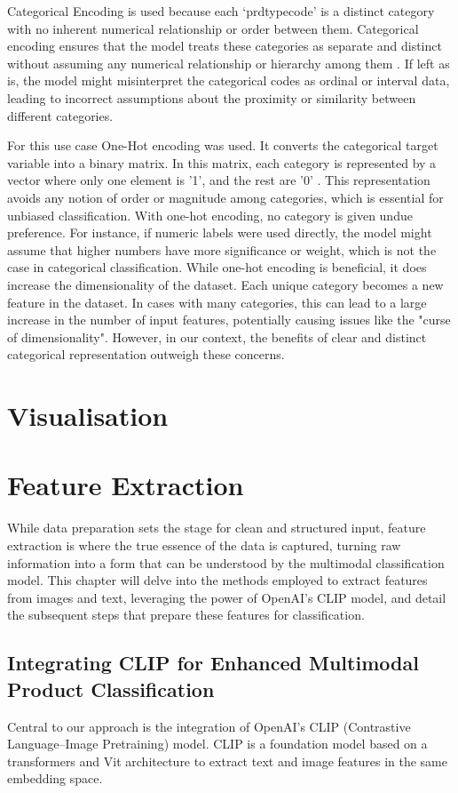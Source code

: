 Categorical Encoding is used because each ‘prdtypecode’ is a distinct category with no inherent numerical relationship or order between them. Categorical encoding ensures that the model treats these categories as separate and distinct without assuming any numerical relationship or hierarchy among them \cite{potdar-2017}. If left as is, the model might misinterpret the categorical codes as ordinal or interval  data, leading to incorrect assumptions about the proximity or similarity between different categories.

For this use case One-Hot encoding was used. It converts the categorical target variable into a binary matrix. In this matrix, each category is represented by a vector where only one element is '1', and the rest are '0' \cite{cerda-2018}. This representation avoids any notion of order or magnitude among categories, which is essential for unbiased classification.
With one-hot encoding, no category is given undue preference. For instance, if numeric labels were used directly, the model might assume that higher numbers have more significance or weight, which is not the case in categorical classification.
While one-hot encoding is beneficial, it does increase the dimensionality of the dataset. Each unique category becomes a new feature in the dataset. In cases with many categories, this can lead to a large increase in the number of input features, potentially causing issues like the "curse of dimensionality"\cite{altman-2018}. However, in our context, the benefits of clear and distinct categorical representation outweigh these concerns.

\section{Visualisation}

\section{Feature Extraction}

While data preparation sets the stage for clean and structured input, feature extraction is where the true essence of the data is captured, turning raw information into a form that can be understood by the multimodal classification model. This chapter will delve into the methods employed to extract features from images and text, leveraging the power of OpenAI's CLIP model, and detail the subsequent steps that prepare these features for classification.

\subsection{Integrating CLIP for Enhanced Multimodal Product Classification}
Central to our approach is the integration of OpenAI's CLIP (Contrastive Language–Image Pretraining) model. CLIP is a foundation model based on a transformers and Vit architecture to extract text and image features in the same embedding space.


